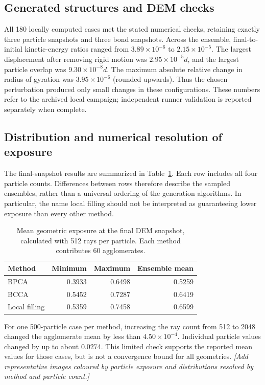 \documentclass[11pt,a4paper]{article}
\newcommand{\pending}[1]{{\color{red}\textit{[#1]}}}
\begin{document}
\subsection{Generated structures and DEM checks}
All 180 locally computed cases met the stated numerical checks, retaining exactly three particle snapshots and three bond snapshots. Across the ensemble, final-to-initial kinetic-energy ratios ranged from $3.89\times10^{-6}$ to $2.15\times10^{-5}$. The largest displacement after removing rigid motion was $2.95\times10^{-5}d$, and the largest particle overlap was $9.30\times10^{-8}d$. The maximum absolute relative change in radius of gyration was $3.95\times10^{-6}$ (rounded upwards). Thus the chosen perturbation produced only small changes in these configurations. These numbers refer to the archived local campaign; independent runner validation is reported separately when complete.

\subsection{Distribution and numerical resolution of exposure}
The final-snapshot results are summarized in Table~\ref{tab:exposure}. Each row includes all four particle counts. Differences between rows therefore describe the sampled ensembles, rather than a universal ordering of the generation algorithms. In particular, the name local filling should not be interpreted as guaranteeing lower exposure than every other method.
\begin{table}[htbp]
\centering
\caption{Mean geometric exposure at the final DEM snapshot, calculated with 512 rays per particle. Each method contributes 60 agglomerates.}\label{tab:exposure}
\begin{tabular}{@{}lrrr@{}}\toprule
Method & Minimum & Maximum & Ensemble mean\\\midrule
BPCA & 0.3933 & 0.6498 & 0.5259\\
BCCA & 0.5452 & 0.7287 & 0.6419\\
Local filling & 0.5359 & 0.7458 & 0.6599\\\bottomrule
\end{tabular}
\end{table}

For one 500-particle case per method, increasing the ray count from 512 to 2048 changed the agglomerate mean by less than $4.50\times10^{-4}$. Individual particle values changed by up to about 0.0274. This limited check supports the reported mean values for those cases, but is not a convergence bound for all geometries. \pending{Add representative images coloured by particle exposure and distributions resolved by method and particle count.}
\end{document}
